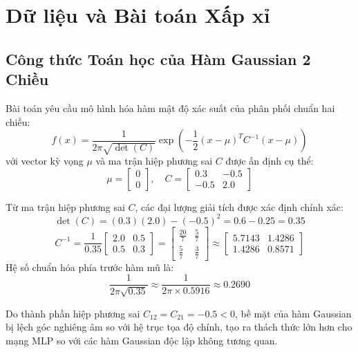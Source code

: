 \documentclass[a4paper,13pt]{extarticle}
\begin{document}
\section{Dữ liệu và Bài toán Xấp xỉ}
\subsection{Công thức Toán học của Hàm Gaussian 2 Chiều}
Bài toán yêu cầu mô hình hóa hàm mật độ xác suất của phân phối chuẩn hai chiều:
\begin{equation}
    f(x) = \frac{1}{2\pi \sqrt{\det(C)}} \exp\left(-\frac{1}{2}(x - \mu)^T C^{-1}(x - \mu)\right)
\end{equation}
với vector kỳ vọng $\mu$ và ma trận hiệp phương sai $C$ được ấn định cụ thể:
\begin{equation}
    \mu = \begin{bmatrix} 0 \\ 0 \end{bmatrix}, \quad
    C = \begin{bmatrix} 0.3 & -0.5 \\ -0.5 & 2.0 \end{bmatrix}
\end{equation}

Từ ma trận hiệp phương sai $C$, các đại lượng giải tích được xác định chính xác:
\begin{equation}
    \det(C) = (0.3)(2.0) - (-0.5)^2 = 0.6 - 0.25 = 0.35
\end{equation}
\begin{equation}
    C^{-1} = \frac{1}{0.35}\begin{bmatrix} 2.0 & 0.5 \\ 0.5 & 0.3 \end{bmatrix} = \begin{bmatrix} \frac{20}{7} & \frac{5}{7} \\ \frac{5}{7} & \frac{3}{7} \end{bmatrix} \approx \begin{bmatrix} 5.7143 & 1.4286 \\ 1.4286 & 0.8571 \end{bmatrix}
\end{equation}
Hệ số chuẩn hóa phía trước hàm mũ là:
\begin{equation}
    \frac{1}{2\pi \sqrt{0.35}} \approx \frac{1}{2\pi \times 0.5916} \approx 0.2690
\end{equation}

Do thành phần hiệp phương sai $C_{12} = C_{21} = -0.5 < 0$, bề mặt của hàm Gaussian bị lệch góc nghiêng âm so với hệ trục tọa độ chính, tạo ra thách thức lớn hơn cho mạng MLP so với các hàm Gaussian độc lập không tương quan.
\end{document}
